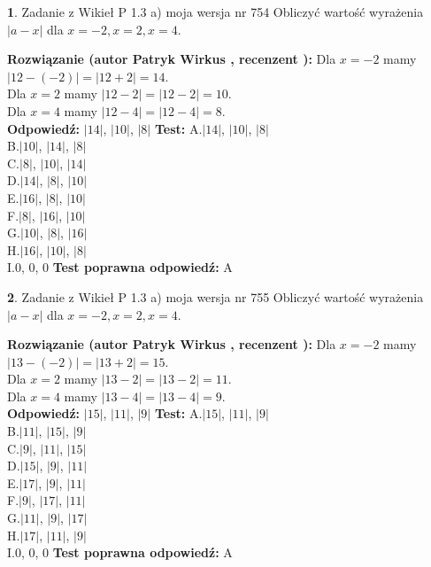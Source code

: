 \documentclass[12pt, a4paper]{article}
\theoremstyle{definition} %
\newtheorem{zad}{}
\newcommand{\zadStart}[1]{\begin{zad}#1\newline}
\newcommand{\zadStop}{\end{zad}}
\newcommand{\rozwStart}[2]{\noindent \textbf{Rozwiązanie (autor #1 , recenzent #2): }\newline}
\newcommand{\rozwStop}{\newline}
\newcommand{\odpStart}{\noindent \textbf{Odpowiedź:}\newline}
\newcommand{\odpStop}{\newline}
\newcommand{\testStart}{\noindent \textbf{Test:}\newline}
\newcommand{\testStop}{\newline}
\newcommand{\kluczStart}{\noindent \textbf{Test poprawna odpowiedź:}\newline}
\newcommand{\kluczStop}{\newline}
\begin{document}
\zadStart{Zadanie z Wikieł P 1.3 a) moja wersja nr 754}
Obliczyć wartość wyrażenia $|a - x|$ dla $x=-2,x=2,x=4$.
\zadStop
\rozwStart{Patryk Wirkus}{}
Dla $x = -2$ mamy $|12 - (-2)| = |12 + 2| = 14$.\\
Dla $x = 2$ mamy $|12 - 2| = |12 - 2| = 10$.\\
Dla $x = 4$ mamy $|12 - 4| = |12 - 4| = 8$.\\
\rozwStop
\odpStart
$|14|$, $|10|$, $|8|$
\odpStop
\testStart
A.$|14|$, $|10|$, $|8|$\\
B.$|10|$, $|14|$, $|8|$\\
C.$|8|$, $|10|$, $|14|$\\
D.$|14|$, $|8|$, $|10|$\\
E.$|16|$, $|8|$, $|10|$\\
F.$|8|$, $|16|$, $|10|$\\
G.$|10|$, $|8|$, $|16|$\\
H.$|16|$, $|10|$, $|8|$\\
I.$0$, $0$, $0$
\testStop
\kluczStart
A
\kluczStop



\zadStart{Zadanie z Wikieł P 1.3 a) moja wersja nr 755}
Obliczyć wartość wyrażenia $|a - x|$ dla $x=-2,x=2,x=4$.
\zadStop
\rozwStart{Patryk Wirkus}{}
Dla $x = -2$ mamy $|13 - (-2)| = |13 + 2| = 15$.\\
Dla $x = 2$ mamy $|13 - 2| = |13 - 2| = 11$.\\
Dla $x = 4$ mamy $|13 - 4| = |13 - 4| = 9$.\\
\rozwStop
\odpStart
$|15|$, $|11|$, $|9|$
\odpStop
\testStart
A.$|15|$, $|11|$, $|9|$\\
B.$|11|$, $|15|$, $|9|$\\
C.$|9|$, $|11|$, $|15|$\\
D.$|15|$, $|9|$, $|11|$\\
E.$|17|$, $|9|$, $|11|$\\
F.$|9|$, $|17|$, $|11|$\\
G.$|11|$, $|9|$, $|17|$\\
H.$|17|$, $|11|$, $|9|$\\
I.$0$, $0$, $0$
\testStop
\kluczStart
A
\kluczStop
\end{document}
